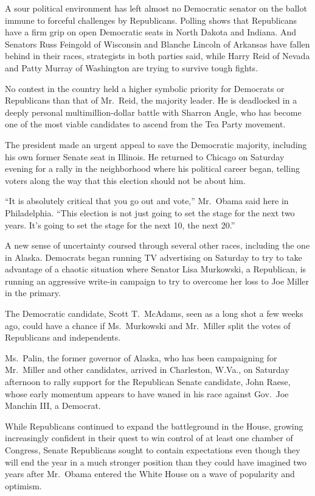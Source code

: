 ﻿\documentclass[12pt]{article}
\begin{document}
A sour political environment has left almost no Democratic senator on the ballot immune to forceful
challenges by Republicans. Polling shows that Republicans have a firm grip on open Democratic seats
in North Dakota and Indiana. And Senators Russ Feingold of Wisconsin and Blanche Lincoln of Arkansas
have fallen behind in their races, strategists in both parties said, while Harry Reid of Nevada and
Patty Murray of Washington are trying to survive tough fights.

No contest in the country held a higher symbolic priority for Democrats or Republicans than that of
Mr.~Reid, the majority leader. He is deadlocked in a deeply personal multimillion-dollar battle with
Sharron Angle, who has become one of the most viable candidates to ascend from the Tea Party
movement.

The president made an urgent appeal to save the Democratic majority, including his own former Senate
seat in Illinois. He returned to Chicago on Saturday evening for a rally in the neighborhood where
his political career began, telling voters along the way that this election should not be about him.

``It is absolutely critical that you go out and vote,'' Mr.~Obama said here in Philadelphia. ``This
election is not just going to set the stage for the next two years. It's going to set the stage for
the next 10, the next 20.''

A new sense of uncertainty coursed through several other races, including the one in Alaska.
Democrats began running TV advertising on Saturday to try to take advantage of a chaotic situation
where Senator Lisa Murkowski, a Republican, is running an aggressive write-in campaign to try to
overcome her loss to Joe Miller in the primary.

The Democratic candidate, Scott T.~McAdams, seen as a long shot a few weeks ago, could have a chance
if Ms.~Murkowski and Mr.~Miller split the votes of Republicans and independents.

Ms.~Palin, the former governor of Alaska, who has been campaigning for Mr.~Miller and other
candidates, arrived in Charleston, W.Va., on Saturday afternoon to rally support for the Republican
Senate candidate, John Raese, whose early momentum appears to have waned in his race against
Gov.~Joe Manchin III, a Democrat.

While Republicans continued to expand the battleground in the House, growing increasingly confident
in their quest to win control of at least one chamber of Congress, Senate Republicans sought to
contain expectations even though they will end the year in a much stronger position than they could
have imagined two years after Mr.~Obama entered the White House on a wave of popularity and
optimism.
\end{document}
